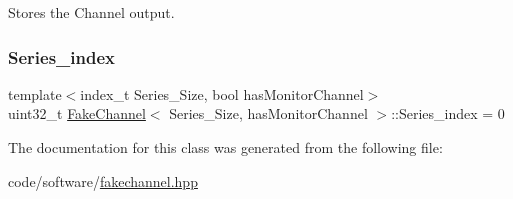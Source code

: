 Stores the Channel output. 

\mbox{\label{classFakeChannel_a471a99ca4707397f949e6c26a3012ffe}} 
\subsubsection{\texorpdfstring{Series\+\_\+index}{Series\_index}}
{\footnotesize\ttfamily template$<$index\+\_\+t Series\+\_\+\+Size, bool has\+Monitor\+Channel$>$ \\
uint32\+\_\+t \hyperlink{classFakeChannel}{Fake\+Channel}$<$ Series\+\_\+\+Size, has\+Monitor\+Channel $>$\+::Series\+\_\+index = 0}



The documentation for this class was generated from the following file\+:\begin{DoxyCompactItemize}
\item 
code/software/\hyperlink{fakechannel_8hpp}{fakechannel.\+hpp}\end{DoxyCompactItemize}
